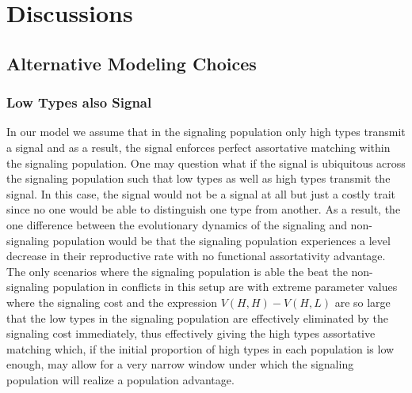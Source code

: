 

  


\section{Discussions}

\subsection{Alternative Modeling Choices}
\subsubsection{Low Types also Signal}
In our model we assume that in the signaling population only high types transmit a signal and as a result, the signal enforces perfect assortative matching within the signaling population. One may question what if the signal is ubiquitous across the signaling population such that low types as well as high types transmit the signal. In this case, the signal would not be a signal at all but just a costly trait since no one would be able to distinguish one type from another. As a result, the one difference between the evolutionary dynamics of the signaling and non-signaling population would be that the signaling population experiences a level decrease in their reproductive rate with no functional assortativity advantage. The only scenarios where the signaling population is able the beat the non-signaling population in conflicts in this setup are with extreme parameter values where the signaling cost and the expression $V(H,H)-V(H,L)$ are so large that the low types in the signaling population are effectively eliminated by the signaling cost immediately, thus effectively giving the high types assortative matching which, if the initial proportion of high types in each population is low enough, may allow for a very narrow window under which the signaling population will realize a population advantage. 

